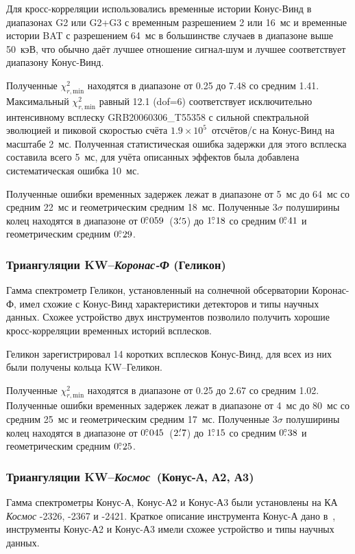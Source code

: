 Для кросс-корреляции использовались временные истории Конус-Винд в диапазонах G2 
или G2+G3 с временным разрешением 2 или 16~мс и временные истории BAT с разрешением 
64~мс в большинстве случаев в диапазоне выше 50~кэВ, что обычно даёт лучшее 
отношение сигнал-шум и лучшее соответствует диапазону Конус-Винд.

Полученные $\chi^2_{r,\textrm{min}}$ находятся в диапазоне от 0.25 до 7.48 со 
средним 1.41. Максимальный $\chi^2_{r,\textrm{min}}$ равный 12.1 (dof=6) 
соответствует исключительно интенсивному всплеску GRB20060306\_T55358 с сильной 
спектральной эволюцией и пиковой скоростью счёта $1.9\times10^5$~отсчётов/с 
на Конус-Винд на масштабе 2~мс. Полученная статистическая ошибка задержки 
для этого всплеска составила всего 5~мс, для учёта описанных эффектов была 
добавлена систематическая ошибка 10~мс.

Полученные ошибки временных задержек лежат в диапазоне от 5~мс до 64~мс со 
средним 22~мс и геометрическим средним 18~мс. Полученные $3\sigma$ полуширины 
колец находятся в диапазоне от $0\mbox{$.\!\!^\circ$}059$~($3\mbox{$.\mkern-4mu^\prime$}5$) 
до $1\mbox{$.\!\!^\circ$}18$ со средним $0\mbox{$.\!\!^\circ$}41$ 
и геометрическим средним $0\mbox{$.\!\!^\circ$}29$.

\subsubsection{Триангуляции KW--\textit{Коронас-Ф} (Геликон)}
Гамма спектрометр Геликон, установленный на солнечной обсерватории Коронас-Ф, 
имел схожие с  Конус-Винд характеристики детекторов и типы научных данных. 
Схожее устройство двух инструментов позволило получить хорошие кросс-корреляции 
временных историй всплесков.

Геликон зарегистрировал 14 коротких всплесков Конус-Винд, для всех из них были 
получены кольца KW--Геликон.

Полученные $\chi^2_{r,\textrm{min}}$ находятся в диапазоне от 0.25 до 2.67 со средним 1.02. 
Полученные ошибки временных задержек лежат в диапазоне от 4~мс до 80~мс со средним 25~мс 
и геометрическим средним 17~мс. Полученные $3\sigma$ полуширины колец находятся 
в диапазоне от $0\mbox{$.\!\!^\circ$}045$~($2\mbox{$.\mkern-4mu^\prime$}7$) до $1\mbox{$.\!\!^\circ$}15$
со средним $0\mbox{$.\!\!^\circ$}38$ и геометрическим средним $0\mbox{$.\!\!^\circ$}25$.

\subsubsection{Триангуляции KW--\textit{Космос}~(Конус-А, А2, А3)}
Гамма спектрометры Конус-А, Конус-А2 и Конус-А3 были установлены на КА 
\textit{Космос} -2326, -2367 и -2421. Краткое описание инструмента Конус-А дано в~\citep{Aptekar_1998ApJ}, 
инструменты Конус-А2 и Конус-А3 имели схожее устройство и типы научных данных.

